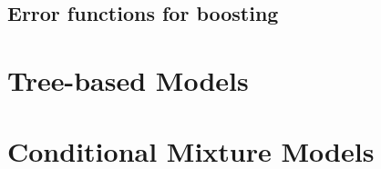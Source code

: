 \subsection{Error functions for boosting}



\section{Tree-based Models}






\section{Conditional Mixture Models}




























